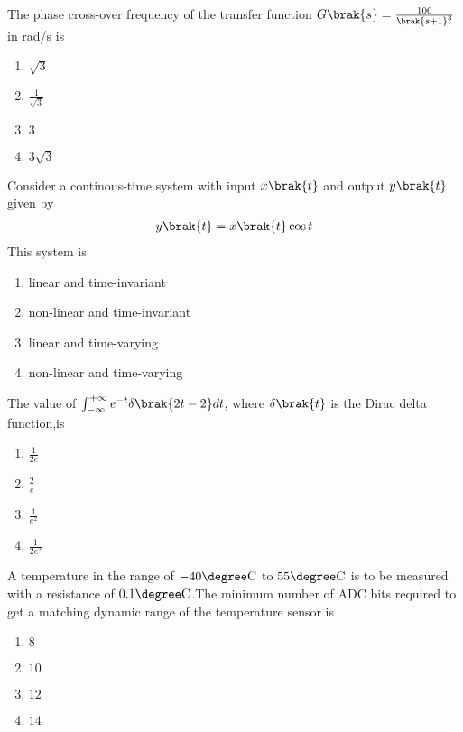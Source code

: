    \item The phase cross-over frequency of the transfer function $G\brak{s} = \frac{100}{\brak{s+1}^3}$ in rad/s is
   \begin{multicols}{4}
       \begin{enumerate}
           \item $\sqrt{3}$
           \item $\frac{1}{\sqrt{3}}$
           \item $3$
           \item $3\sqrt{3}$
       \end{enumerate}
   \end{multicols}
   \item Consider a continous-time system with input $x\brak{t}$ and output $y\brak{t}$ given by 
   \begin{align}
       y\brak{t} = x\brak{t}\cos{t}
   \end{align}
   This system is
   \begin{enumerate}
       \item linear and time-invariant
       \item non-linear and time-invariant
       \item linear and time-varying
       \item non-linear and time-varying\\
   \end{enumerate}
   \item The value of $\int_{-\infty}^{+\infty} e^{-t} \delta\brak{2t-2}dt$, where $\delta \brak{t}$ is the Dirac delta function,is
   \begin{multicols}{4}
       \begin{enumerate}
           \item $\frac{1}{2e}$
           \item $\frac{2}{e}$
           \item $\frac{1}{e^2}$
           \item $\frac{1}{2e^2}$
       \end{enumerate}
   \end{multicols}
   \item A temperature in the range of $-40\degree\text{C}$ to $55\degree\text{C}$ is to
   be measured with a resistance of $0.1\degree\text{C}$.The minimum number of ADC bits required to get a matching dynamic range of the temperature sensor is
   \begin{multicols}{4}
       \begin{enumerate}
           \item $8$
           \item $10$
           \item $12$
           \item $14$
       \end{enumerate}
   \end{multicols}
